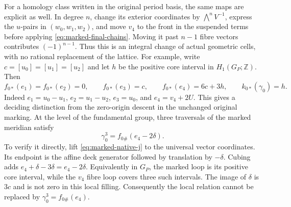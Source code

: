 For a homology class written in the original period basis, the
same maps are explicit as well. In degree $n$, change its exterior
coordinates by $\bigwedge^nV^{-1}$, express the $u$-pairs in
$(w_0,w_1,w_2)$, and move $v_4$ to the front in the suspended
terms before applying \eqref{eq:marked-final-chains}. Moving it
past $n-1$ fibre vectors contributes $(-1)^{n-1}$.
Thus this is an integral change of actual geometric
cells, with no rational replacement of the lattice.
For example, write $c=[u_0]=[u_1]=[u_2]$ and let $h$ be the
positive core interval in $H_1(G_P;\mathbb Z)$. Then
\begin{equation}\label{eq:marked-degree-one}
 f_{0*}(e_1)=f_{0*}(e_2)=0,\qquad
 f_{0*}(e_3)=c,\qquad f_{0*}(e_4)=6c+3h,
 \qquad k_{0*}(\gamma_0)=h.
\end{equation}
Indeed $e_1=u_0-u_1$, $e_2=u_1-u_2$, $e_3=u_0$,
and $e_4=v_4+2U$. This gives a deciding distinction from the
zero-origin descent in the unchanged original marking.
At the level of the fundamental group, three traversals of
the marked meridian satisfy
\begin{equation}\label{eq:marked-meridian-relation}
                   \gamma_0^3=f_{0\#}(e_4-2\delta).
\end{equation}
To verify it directly, lift \eqref{eq:marked-native-j} to the
universal vector coordinates. Its endpoint is the affine deck
generator followed by translation by $-\delta$. Cubing adds
$e_4+\delta-3\delta=e_4-2\delta$. Equivalently in $G_P$, the
marked loop is its positive core interval, while the $v_4$ fibre
loop covers three such intervals. The image of $\delta$ is
$3c$ and is not zero in this local filling. Consequently the
local relation cannot be replaced by $\gamma_0^3=f_{0\#}(e_4)$.

